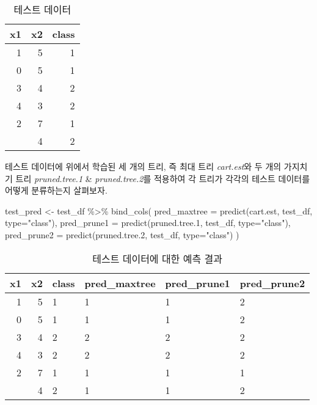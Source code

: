 \documentclass[
]{book}
\newenvironment{Shaded}{\begin{snugshade}}{\end{snugshade}}
\newcommand{\AttributeTok}[1]{\textcolor[rgb]{0.77,0.63,0.00}{#1}}
\newcommand{\FloatTok}[1]{\textcolor[rgb]{0.00,0.00,0.81}{#1}}
\newcommand{\FunctionTok}[1]{\textcolor[rgb]{0.00,0.00,0.00}{#1}}
\newcommand{\NormalTok}[1]{#1}
\newcommand{\OtherTok}[1]{\textcolor[rgb]{0.56,0.35,0.01}{#1}}
\newcommand{\SpecialCharTok}[1]{\textcolor[rgb]{0.00,0.00,0.00}{#1}}
\newcommand{\StringTok}[1]{\textcolor[rgb]{0.31,0.60,0.02}{#1}}
\begin{document}
\begin{table}

\caption{\label{tab:tree-test-data-table}테스트 데이터}
\centering
\begin{tabular}[t]{rrr}
\toprule
x1 & x2 & class\\
\midrule
1 & 5 & 1\\
0 & 5 & 1\\
3 & 4 & 2\\
4 & 3 & 2\\
2 & 7 & 1\\
\addlinespace
1 & 4 & 2\\
\bottomrule
\end{tabular}
\end{table}

테스트 데이터에 위에서 학습된 세 개의 트리, 즉 최대 트리 \emph{cart.est}와 두 개의 가지치기 트리 \emph{pruned.tree.1} \& \emph{pruned.tree.2}를 적용하여 각 트리가 각각의 테스트 데이터를 어떻게 분류하는지 살펴보자.

\begin{Shaded}
\begin{Highlighting}[]
\NormalTok{test\_pred }\OtherTok{\textless{}{-}}\NormalTok{ test\_df }\SpecialCharTok{\%\textgreater{}\%}
  \FunctionTok{bind\_cols}\NormalTok{(}
    \AttributeTok{pred\_maxtree =} \FunctionTok{predict}\NormalTok{(cart.est, test\_df, }\AttributeTok{type=}\StringTok{"class"}\NormalTok{),}
    \AttributeTok{pred\_prune1 =} \FunctionTok{predict}\NormalTok{(pruned.tree}\FloatTok{.1}\NormalTok{, test\_df, }\AttributeTok{type=}\StringTok{"class"}\NormalTok{),}
    \AttributeTok{pred\_prune2 =} \FunctionTok{predict}\NormalTok{(pruned.tree}\FloatTok{.2}\NormalTok{, test\_df, }\AttributeTok{type=}\StringTok{"class"}\NormalTok{)}
\NormalTok{  )}
\end{Highlighting}
\end{Shaded}

\begin{table}

\caption{\label{tab:tree-class-prediction-table}테스트 데이터에 대한 예측 결과}
\centering
\begin{tabular}[t]{rrllll}
\toprule
x1 & x2 & class & pred\_maxtree & pred\_prune1 & pred\_prune2\\
\midrule
1 & 5 & 1 & 1 & 1 & 2\\
0 & 5 & 1 & 1 & 1 & 2\\
3 & 4 & 2 & 2 & 2 & 2\\
4 & 3 & 2 & 2 & 2 & 2\\
2 & 7 & 1 & 1 & 1 & 1\\
\addlinespace
1 & 4 & 2 & 1 & 1 & 2\\
\bottomrule
\end{tabular}
\end{table}
\end{document}
